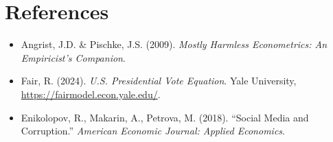 \documentclass[12pt,a4paper]{article}
\begin{document}
\newpage
\section*{References}
\begin{itemize}
  \item Angrist, J.D. \& Pischke, J.S. (2009). \textit{Mostly Harmless Econometrics: An Empiricist’s Companion}.
  \item Fair, R. (2024). \textit{U.S. Presidential Vote Equation}. Yale University, \url{https://fairmodel.econ.yale.edu/}.
  \item Enikolopov, R., Makarin, A., Petrova, M. (2018). “Social Media and Corruption.” \textit{American Economic Journal: Applied Economics}.
\end{itemize}
\end{document}
